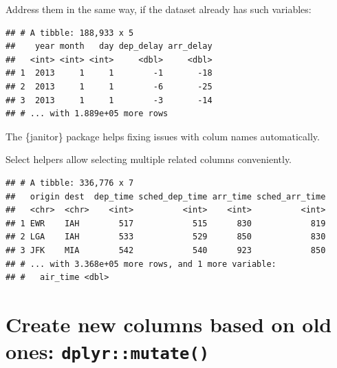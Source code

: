 \documentclass[]{book}
\newenvironment{Shaded}{}{}
\newcommand{\DataTypeTok}[1]{#1}
\newcommand{\KeywordTok}[1]{\textcolor[rgb]{0.00,0.00,1.00}{#1}}
\newcommand{\NormalTok}[1]{#1}
\newcommand{\OperatorTok}[1]{#1}
\newcommand{\StringTok}[1]{\textcolor[rgb]{0.00,0.50,0.50}{#1}}
\begin{document}
Address them in the same way, if the dataset already has such variables:

\begin{Shaded}
\end{Shaded}

\begin{verbatim}
## # A tibble: 188,933 x 5
##    year month   day dep_delay arr_delay
##   <int> <int> <int>     <dbl>     <dbl>
## 1  2013     1     1        -1       -18
## 2  2013     1     1        -6       -25
## 3  2013     1     1        -3       -14
## # ... with 1.889e+05 more rows
\end{verbatim}

The \{janitor\} package helps fixing issues with colum names automatically.

Select helpers allow selecting multiple related columns conveniently.

\begin{Shaded}
\end{Shaded}

\begin{verbatim}
## # A tibble: 336,776 x 7
##   origin dest  dep_time sched_dep_time arr_time sched_arr_time
##   <chr>  <chr>    <int>          <int>    <int>          <int>
## 1 EWR    IAH        517            515      830            819
## 2 LGA    IAH        533            529      850            830
## 3 JFK    MIA        542            540      923            850
## # ... with 3.368e+05 more rows, and 1 more variable:
## #   air_time <dbl>
\end{verbatim}

\hypertarget{create-new-columns-based-on-old-ones-dplyrmutate}{%
\section{\texorpdfstring{Create new columns based on old ones: \texttt{dplyr::mutate()}}{Create new columns based on old ones: dplyr::mutate()}}\label{create-new-columns-based-on-old-ones-dplyrmutate}}
\end{document}
